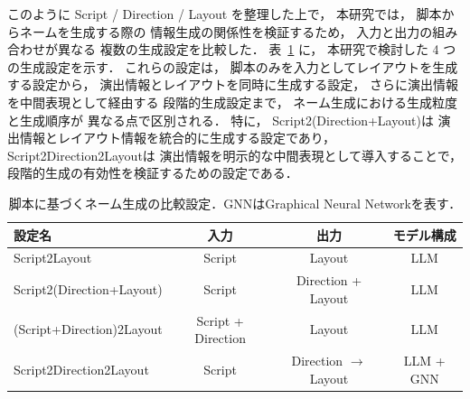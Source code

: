 \documentclass[a4j,12pt,dvipdfmx]{jsreport}
\begin{document}
このように Script / Direction / Layout を整理した上で，
本研究では，
脚本からネームを生成する際の
情報生成の関係性を検証するため，
入力と出力の組み合わせが異なる
複数の生成設定を比較した．
表~\ref{tab:script2name_settings} に，
本研究で検討した 4 つの生成設定を示す．
これらの設定は，
脚本のみを入力としてレイアウトを生成する設定から，
演出情報とレイアウトを同時に生成する設定，
さらに演出情報を中間表現として経由する
段階的生成設定まで，
ネーム生成における生成粒度と生成順序が
異なる点で区別される．
特に，
Script2(Direction+Layout)は
演出情報とレイアウト情報を統合的に生成する設定であり，
Script2Direction2Layoutは
演出情報を明示的な中間表現として導入することで，
段階的生成の有効性を検証するための設定である．

\begin{table}[htbp]
   \centering
   \caption{脚本に基づくネーム生成の比較設定．GNNはGraphical Neural Networkを表す．}
   \label{tab:script2name_settings}

   \small

   \setlength{\tabcolsep}{3pt}

   \begin{tabular}{lccc}
      \toprule
      \textbf{設定名} & \textbf{入力}                    & \textbf{出力} & \textbf{モデル構成} \\
      \midrule
      Script2Layout
                   & Script
                   & Layout
                   & LLM                                                           \\
      \addlinespace
      Script2(Direction+Layout)
                   & Script
                   & Direction + Layout
                   & LLM                                                           \\
      \addlinespace
      (Script+Direction)2Layout
                   & Script + Direction
                   & Layout
                   & LLM                                                           \\
      \addlinespace
      Script2Direction2Layout
                   & Script
                   & Direction $\rightarrow$ Layout
                   & LLM + GNN                                                     \\
      \bottomrule
   \end{tabular}
\end{table}
\end{document}
